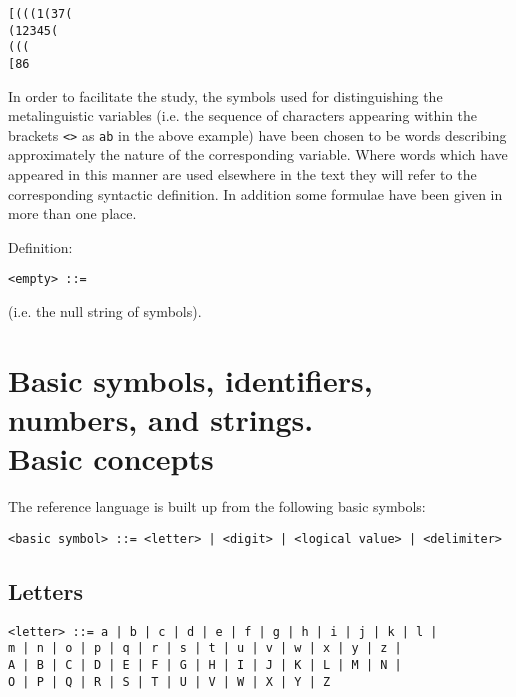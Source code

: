 \documentclass[a4paper,11pt]{article}
\begin{document}
\begin{verbatim}
[(((1(37(
(12345(
(((
[86
\end{verbatim}


In order to facilitate the study, the symbols used for distinguishing
the metalinguistic variables (i.e. the sequence of characters
appearing within the brackets \texttt{<>} as \texttt{ab} in the above
example) have been chosen to be words describing approximately the
nature of the corresponding variable. Where words which have appeared
in this manner are used elsewhere in the text they will refer to the
corresponding syntactic definition. In addition some formulae have
been given in more than one place.

    Definition:
\begin{flushleft}
\vspace{0.2em}\texttt{<empty> ::=}\\
\end{flushleft}

(i.e. the null string of symbols).



\section[Basic symbols, identifiers, numbers, and strings]{Basic symbols, identifiers, numbers, and strings.\\
  Basic concepts}
\label{LblBasicSymbols}



The reference language is built up from the following basic symbols:

\begin{flushleft}
\vspace{0.2em}\texttt{<basic symbol> ::= <letter> | <digit> | <logical value> | <delimiter>}\\
\end{flushleft}



\subsection{Letters}
\label{LblBasicSymbolsLetters}


\begin{flushleft}
\vspace{0.2em}\texttt{<letter> ::= a | b | c | d | e | f | g | h | i | j | k | l |\\
  \hspace{1cm}m | n | o | p | q | r | s | t | u | v | w | x | y | z |\\
  \hspace{1cm}A | B | C | D | E | F | G | H | I | J | K | L | M | N |\\
  \hspace{1cm}O | P | Q | R | S | T | U | V | W | X | Y | Z}\\
\end{flushleft}
\end{document}
